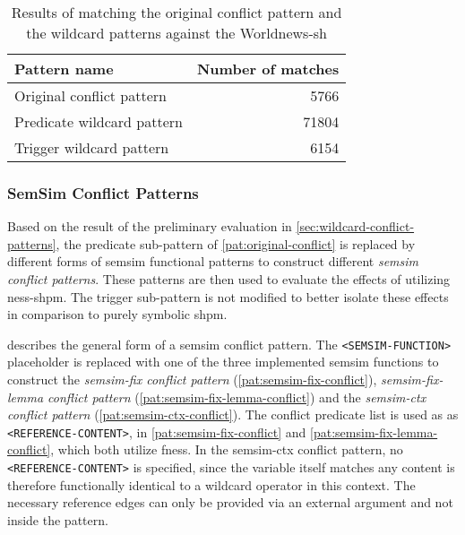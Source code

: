 \documentclass[11pt, numbers=noenddot]{scrreprt}
\begin{document}
\begin{table}[h]
\centering
\begin{tabular}{lr}
\toprule
\multicolumn{1}{l}{Pattern name}				& \multicolumn{1}{l}{Number of matches} \\
\midrule
Original conflict pattern					& 5766	\\
Predicate wildcard pattern					& 71804 \\
Trigger wildcard pattern						& 6154	\\
\bottomrule
\end{tabular}
\caption{Results of matching the original conflict pattern and the wildcard patterns against the Worldnews-\gls{sh}}
\label{tab:wildcard-pattern-evaluation}
\end{table}



\subsubsection{SemSim Conflict Patterns}
Based on the result of the preliminary evaluation in \cref{sec:wildcard-conflict-patterns}, the predicate sub-pattern of \cref{pat:original-conflict} is replaced by different forms of semsim functional patterns to construct different \textit{semsim conflict patterns}. These patterns are then used to evaluate the effects of utilizing \gls{ness-shpm}. The trigger sub-pattern is not modified to better isolate these effects in comparison to purely symbolic \gls{shpm}.

 describes the general form of a semsim conflict pattern. The \texttt{<SEMSIM-FUNCTION>} placeholder is replaced with one of the three implemented semsim functions to construct the \textit{semsim-fix conflict pattern} (\cref{pat:semsim-fix-conflict}), \textit{semsim-fix-lemma conflict pattern} (\cref{pat:semsim-fix-lemma-conflict}) and the \textit{semsim-ctx conflict pattern} (\cref{pat:semsim-ctx-conflict}). The conflict predicate list is used as as \texttt{<REFERENCE-CONTENT>}, in \cref{pat:semsim-fix-conflict} and \cref{pat:semsim-fix-lemma-conflict}, which both utilize \gls{fness}. In the semsim-ctx conflict pattern, no \texttt{<REFERENCE-CONTENT>} is specified, since the variable itself matches any content is therefore functionally identical to a wildcard operator in this context. The necessary reference edges can only be provided via an external argument and not inside the pattern.
\end{document}
